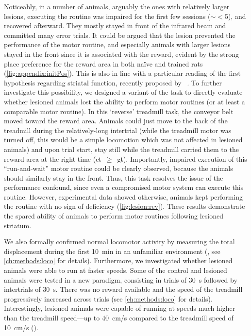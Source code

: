 \par
Noticeably, in a number of animals, arguably the ones with relatively larger lesions, executing the routine was impaired for the first few sessions ($\sim<$5), and recovered afterward.
They mostly stayed in front of the infrared beam and committed many error trials.
It could be argued that the lesion prevented the performance of the motor routine, and especially animals with larger lesions stayed in the front since it is associated with the reward, evident by the strong place preference for the reward area in both na\"{i}ve and trained rats (\autoref{fig:appendix:initPos}).
This is also in line with a particular reading of the first hypothesis regarding striatal function, recently proposed by \citeauthor{Dhawale2019}~\cite{Dhawale2019}.
To further investigate this possibility, we designed a variant of the task to directly evaluate whether lesioned animals lost the ability to perform motor routines (or at least a comparable motor routine).
In this `reverse' treadmill task, the conveyor belt moved toward the reward area.
Animals could just move to the back of the treadmill during the relatively-long intertrial (while the treadmill motor was turned off, this would be a simple locomotion which was not affected in lesioned animals) and upon trial start, stay still while the treadmill carried them to the reward area at the right time (\gls{et}~$\geq$~\gls{gt}).
Importantly, impaired execution of this ``run-and-wait'' motor routine could be clearly observed, because the animals should similarly stay in the front.
Thus, this task resolves the issue of the performance confound, since even a compromised motor system can execute this routine.
However, experimental data showed otherwise, animals kept performing the routine with no sign of deficiency (\autoref{fig:lesion:rev}).
These results demonstrate the spared ability of animals to perform motor routines following lesioned striatum.
\par
We also formally confirmed normal locomotor activity by measuring the total displacement during the first 10~min in an unfamiliar environment (, see \autoref{ch:methods:loco} for details).
Furthermore, we investigated whether lesioned animals were able to run at faster speeds.
Some of the control and lesioned animals were tested in a new paradigm, consisting in trials of 30~s followed by intertrials of 30~s.
There was no reward available and the speed of the treadmill progressively increased across trials (see \autoref{ch:methods:loco} for details).
Interestingly, lesioned animals were capable of running at speeds much higher than the treadmill speed---up to 40~cm/s compared to the treadmill speed of 10~cm/s ().
